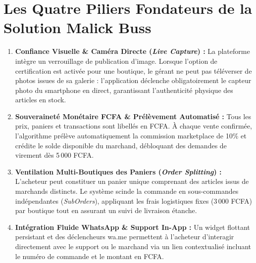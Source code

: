 \documentclass[11pt,a4paper,titlepage]{report}
\begin{document}
\section{Les Quatre Piliers Fondateurs de la Solution Malick Buss}
\begin{enumerate}[label=\textbf{\arabic*.}]
    \item \textbf{Confiance Visuelle \& Caméra Directe (\textit{Live Capture}) :}
    La plateforme intègre un verrouillage de publication d'image. Lorsque l'option de certification est activée pour une boutique, le gérant ne peut pas téléverser de photos issues de sa galerie : l'application déclenche obligatoirement le capteur photo du smartphone en direct, garantissant l'authenticité physique des articles en stock.
    
    \item \textbf{Souveraineté Monétaire FCFA \& Prélèvement Automatisé :}
    Tous les prix, paniers et transactions sont libellés en FCFA. À chaque vente confirmée, l'algorithme prélève automatiquement la commission marketplace de 10\% et crédite le solde disponible du marchand, débloquant des demandes de virement dès 5\,000 FCFA.
    
    \item \textbf{Ventilation Multi-Boutiques des Paniers (\textit{Order Splitting}) :}
    L'acheteur peut constituer un panier unique comprenant des articles issus de marchands distincts. Le système scinde la commande en sous-commandes indépendantes (\textit{SubOrders}), appliquant les frais logistiques fixes (3\,000 FCFA) par boutique tout en assurant un suivi de livraison étanche.
    
    \item \textbf{Intégration Fluide WhatsApp \& Support In-App :}
    Un widget flottant persistant et des déclencheurs wa.me permettent à l'acheteur d'interagir directement avec le support ou le marchand via un lien contextualisé incluant le numéro de commande et le montant en FCFA.
\end{enumerate}
\end{document}
